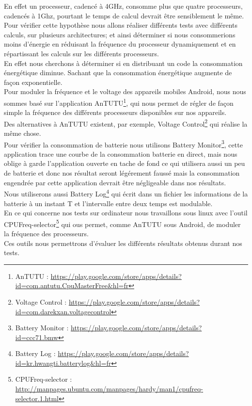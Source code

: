 	En effet un processeur, cadencé à 4GHz, consomme plus que quatre processeurs, cadencés à 1Ghz, pourtant le temps de calcul devrait être sensiblement le même. Pour vérifier cette hypothèse nous allons réaliser différents tests avec différents calculs, sur plusieurs architectures; et ainsi déterminer si nous consommerions moins d'énergie en réduisant la fréquence du processeur dynamiquement et en répartissant les calculs sur les différents processeurs.\\

	En effet nous cherchons à déterminer si en distribuant un code la consommation énergétique diminue. Sachant que la consommation énergétique augmente de façon exponentielle.\\

	Pour moduler la fréquence et le voltage des appareils mobiles Android, nous nous sommes basé sur l'application AnTUTU\footnote{AnTUTU : \url{https://play.google.com/store/apps/details?id=com.antutu.CpuMasterFree&hl=fr}}, qui nous permet de régler de façon simple la fréquence des différents processeurs disponibles sur nos appareils.\\

	Des alternatives à AnTUTU existent, par exemple, Voltage Control\footnote{Voltage Control : \url{https://play.google.com/store/apps/details?id=com.darekxan.voltagecontrol}} qui réalise la même chose. \\

	Pour vérifier la consommation de batterie nous utilisons Battery Monitor\footnote{Battery Monitor : \url{https://play.google.com/store/apps/details?id=ccc71.bmw}}, cette application trace une courbe de la consommation batterie en direct, mais nous oblige à garde l'application ouverte en tache de fond ce qui utilisera aussi un peu de batterie et donc nos résultat seront légérement faussé mais la consommation engendrée par cette application devrait être négligeable dans nos résultats. \\

	Nous utiliserons aussi Battery Log\footnote{Battery Log : \url{https://play.google.com/store/apps/details?id=kr.hwangti.batterylog&hl=fr}} qui écrit dans un fichier les informations de la batterie à un instant T et l'intervalle entre deux temps est modulable.\\

	En ce qui concerne nos tests sur ordinateur nous travaillons sous linux avec l'outil CPUFreq-selector\footnote{CPUFreq-selector : \url{http://manpages.ubuntu.com/manpages/hardy/man1/cpufreq-selector.1.html}} qui ous permet, comme AnTUTU sous Android, de moduler la fréquence des processeurs.\\

	Ces outils nous permettrons d'évaluer les différents résultats obtenus durant nos tests.
